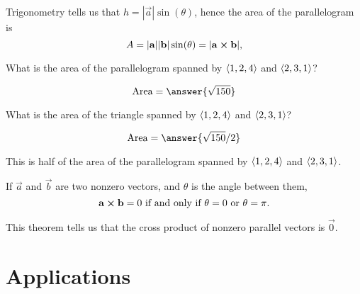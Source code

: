 \documentclass{ximera}
\begin{document}
\begin{theorem}
\begin{explanation}
\begin{image}[2in]
    \end{image}
    Trigonometry tells us that $h = |\vec{a}| \sin(\theta)$, hence the
    area of the parallelogram is
    \[
    A = |\mathbf{a}||\mathbf{b}|\sin(\theta) = |\mathbf{a}\boldsymbol\times\mathbf{b}|,
    \]
  \end{explanation}
\end{theorem}
\begin{question}
  What is the area of the parallelogram spanned by $\left\langle 1,2,4\right\rangle$ and $\left\langle 2,3,1\right\rangle$?
  \begin{prompt}
  \[
  \text{Area} = \answer{\sqrt{150}}
  \]
  \end{prompt}
  \begin{question}
    What is the area of the triangle spanned by $\left\langle 1,2,4\right\rangle$ and $\left\langle 2,3,1\right\rangle$?
    \begin{prompt}
    \[
    \text{Area} = \answer{\sqrt{150}/2}
    \]
    \end{prompt}
    \begin{hint}
      This is half of the area of the parallelogram spanned by $\left\langle 1,2,4\right\rangle$ and $\left\langle 2,3,1\right\rangle$.
    \end{hint}
  \end{question}
\end{question}



\begin{theorem}
  If $\vec{a}$ and $\vec{b}$ are two nonzero vectors, and $\theta$ is
  the angle between them,
  \[
  \mathbf{a}\boldsymbol\times \mathbf{b} = 0 \text{ if and only if $\theta=
  0$ or $\theta=\pi$}.
  \]
\end{theorem}

This theorem tells us that the cross product of nonzero parallel
vectors is $\vec{0}$.




\section{Applications}
\end{document}
